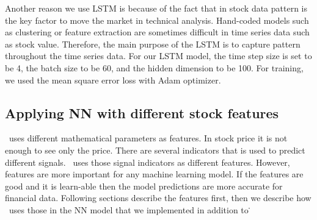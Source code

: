 Another reason we use LSTM is because of the fact that in stock data pattern is the key factor to move the market in technical analysis. Hand-coded models such as clustering or feature extraction are sometimes difficult in time series data such as stock value. Therefore, the main purpose of the LSTM is to capture pattern throughout the time series data. For our LSTM model, the time step size is set to be 4, the batch size to be 60, and the hidden dimension to be 100. For training, we used the mean square error loss with Adam optimizer. 


\subsection{Applying NN with different stock features}
\label{sec-features}
\scheme\ uses different mathematical parameters as features. In stock price it is not enough to see only the price. There are several indicators that is used to predict different signals. \scheme\ uses those signal indicators as different features. However, features are more important for any machine learning model. If the features are good and it is learn-able then the model predictions are more accurate for financial data. Following sections describe the features first, then we describe how \scheme\ uses those in the NN model that we implemented in addition to \scheme\.

